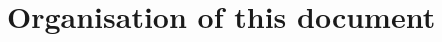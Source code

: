 \documentclass[12pt,beltcrest]{ociamthesis} %
\begin{document}



\section{Organisation of this document} %
\label{sec:organisation_of_this_document}










\appendix



\renewcommand{\bibname}{References}
\end{document}
